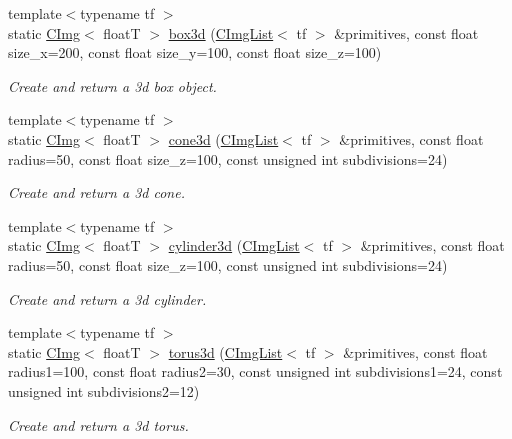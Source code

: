 \begin{DoxyCompactItemize}
\item 
{\footnotesize template$<$typename tf $>$ }\\static \hyperlink{structcimg__library_1_1CImg}{CImg}$<$ floatT $>$ \hyperlink{structcimg__library_1_1CImg_a6ddc3792c0719946b719919678824162}{box3d} (\hyperlink{structcimg__library_1_1CImgList}{CImgList}$<$ tf $>$ \&primitives, const float size\_\-x=200, const float size\_\-y=100, const float size\_\-z=100)
\begin{DoxyCompactList}\small\item\em Create and return a 3d box object. \item\end{DoxyCompactList}\item 
{\footnotesize template$<$typename tf $>$ }\\static \hyperlink{structcimg__library_1_1CImg}{CImg}$<$ floatT $>$ \hyperlink{structcimg__library_1_1CImg_a44869966dbb252afbefd3074dfd028c8}{cone3d} (\hyperlink{structcimg__library_1_1CImgList}{CImgList}$<$ tf $>$ \&primitives, const float radius=50, const float size\_\-z=100, const unsigned int subdivisions=24)
\begin{DoxyCompactList}\small\item\em Create and return a 3d cone. \item\end{DoxyCompactList}\item 
{\footnotesize template$<$typename tf $>$ }\\static \hyperlink{structcimg__library_1_1CImg}{CImg}$<$ floatT $>$ \hyperlink{structcimg__library_1_1CImg_a0142f7f2af1d840da9986b41832f282d}{cylinder3d} (\hyperlink{structcimg__library_1_1CImgList}{CImgList}$<$ tf $>$ \&primitives, const float radius=50, const float size\_\-z=100, const unsigned int subdivisions=24)
\begin{DoxyCompactList}\small\item\em Create and return a 3d cylinder. \item\end{DoxyCompactList}\item 
{\footnotesize template$<$typename tf $>$ }\\static \hyperlink{structcimg__library_1_1CImg}{CImg}$<$ floatT $>$ \hyperlink{structcimg__library_1_1CImg_afe12f532a1faf7ba4dbdd32297cdbe6e}{torus3d} (\hyperlink{structcimg__library_1_1CImgList}{CImgList}$<$ tf $>$ \&primitives, const float radius1=100, const float radius2=30, const unsigned int subdivisions1=24, const unsigned int subdivisions2=12)
\begin{DoxyCompactList}\small\item\em Create and return a 3d torus. \item\end{DoxyCompactList}\item 

\end{DoxyCompactItemize}
